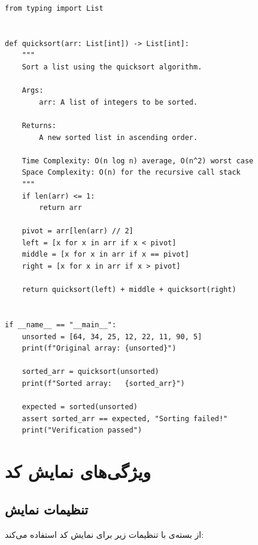 \documentclass{matinbook}
\begin{document}
\begin{latin}
\begin{verbatim}
from typing import List


def quicksort(arr: List[int]) -> List[int]:
    """
    Sort a list using the quicksort algorithm.

    Args:
        arr: A list of integers to be sorted.

    Returns:
        A new sorted list in ascending order.

    Time Complexity: O(n log n) average, O(n^2) worst case
    Space Complexity: O(n) for the recursive call stack
    """
    if len(arr) <= 1:
        return arr

    pivot = arr[len(arr) // 2]
    left = [x for x in arr if x < pivot]
    middle = [x for x in arr if x == pivot]
    right = [x for x in arr if x > pivot]

    return quicksort(left) + middle + quicksort(right)


if __name__ == "__main__":
    unsorted = [64, 34, 25, 12, 22, 11, 90, 5]
    print(f"Original array: {unsorted}")

    sorted_arr = quicksort(unsorted)
    print(f"Sorted array:   {sorted_arr}")

    expected = sorted(unsorted)
    assert sorted_arr == expected, "Sorting failed!"
    print("Verification passed")
\end{verbatim}
\end{latin}
\label{code:quicksort}

\chapter{ویژگی‌های نمایش کد}
\label{chap:code-features}

\section{تنظیمات نمایش}
\label{sec:code-settings}

 از بسته‌ی  با تنظیمات زیر برای
نمایش کد استفاده می‌کند:
\end{document}
